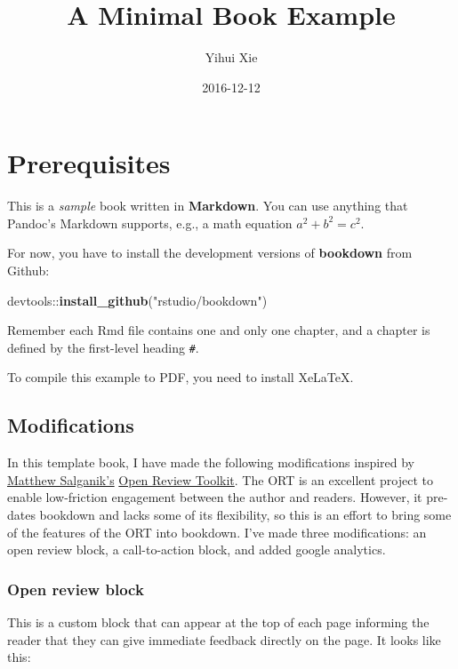 \documentclass[]{book}
\title{A Minimal Book Example}
\author{Yihui Xie}
\date{2016-12-12}
\newenvironment{Shaded}{\begin{snugshade}}{\end{snugshade}}
\newcommand{\KeywordTok}[1]{\textcolor[rgb]{0.13,0.29,0.53}{\textbf{{#1}}}}
\newcommand{\StringTok}[1]{\textcolor[rgb]{0.31,0.60,0.02}{{#1}}}
\newcommand{\NormalTok}[1]{{#1}}
\begin{document}
\maketitle

{
\setcounter{tocdepth}{1}
\tableofcontents
}
\chapter{Prerequisites}\label{prerequisites}

This is a \emph{sample} book written in \textbf{Markdown}. You can use
anything that Pandoc's Markdown supports, e.g., a math equation
\(a^2 + b^2 = c^2\).

For now, you have to install the development versions of
\textbf{bookdown} from Github:

\begin{Shaded}
\begin{Highlighting}[]
\NormalTok{devtools::}\KeywordTok{install_github}\NormalTok{(}\StringTok{"rstudio/bookdown"}\NormalTok{)}
\end{Highlighting}
\end{Shaded}

Remember each Rmd file contains one and only one chapter, and a chapter
is defined by the first-level heading \texttt{\#}.

To compile this example to PDF, you need to install XeLaTeX.

\section{Modifications}\label{modifications}

In this template book, I have made the following modifications inspired
by \href{https://twitter.com/msalganik}{Matthew Salganik's}
\href{http://www.openreviewtoolkit.org/}{Open Review Toolkit}. The ORT
is an excellent project to enable low-friction engagement between the
author and readers. However, it pre-dates bookdown and lacks some of its
flexibility, so this is an effort to bring some of the features of the
ORT into bookdown. I've made three modifications: an open review block,
a call-to-action block, and added google analytics.

\subsection{Open review block}\label{open-review-block}

This is a custom block that can appear at the top of each page informing
the reader that they can give immediate feedback directly on the page.
It looks like this:
\end{document}
